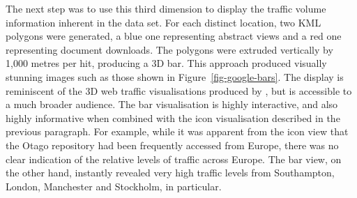 \documentclass[10pt]{article}
\begin{document}
The next step was to use this third dimension to display the traffic volume information inherent in the data set. For each distinct location, two KML polygons were generated, a blue one representing abstract views and a red one representing document downloads. The polygons were extruded vertically by 1,000 metres per hit, producing a 3D bar. This approach produced visually stunning images such as those shown in Figure~\ref{fig-google-bars}. The display is reminiscent of the 3D web traffic visualisations produced by , but is accessible to a much broader audience. The bar visualisation is highly interactive, and also highly informative when combined with the icon visualisation described in the previous paragraph. For example, while it was apparent from the icon view that the Otago repository had been frequently accessed from Europe, there was no clear indication of the relative levels of traffic across Europe. The bar view, on the other hand, instantly revealed very high traffic levels from Southampton, London, Manchester and Stockholm, in particular.
\end{document}
